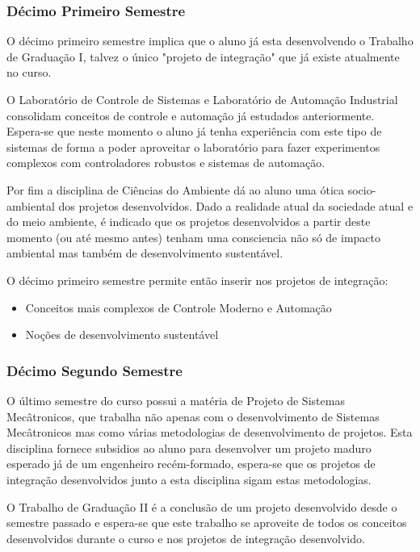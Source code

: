 \documentclass[12pt]{article} %
\begin{document}
\subsubsection{Décimo Primeiro Semestre}

O décimo primeiro semestre implica que o aluno já esta desenvolvendo o Trabalho de Graduação I, talvez o único "projeto de integração" que já existe atualmente no curso.

O Laboratório de Controle de Sistemas e Laboratório de Automação Industrial consolidam conceitos de controle e automação já estudados anteriormente. Espera-se que neste momento o aluno já tenha experiência com este tipo de sistemas de forma a poder aproveitar o laboratório para fazer experimentos complexos com controladores robustos e sistemas de automação.

Por fim a disciplina de Ciências do Ambiente dá ao aluno uma ótica socio-ambiental dos projetos desenvolvidos. Dado a realidade atual da sociedade atual e do meio ambiente, é indicado que os projetos desenvolvidos a partir deste momento (ou até mesmo antes) tenham uma consciencia não só de impacto ambiental mas também de desenvolvimento sustentável. 

O décimo primeiro semestre permite então inserir nos projetos de integração:

\begin{itemize}
\item Conceitos mais complexos de Controle Moderno e Automação
\item Noções de desenvolvimento sustentável
\end{itemize}

\subsubsection{Décimo Segundo Semestre}

O último semestre do curso possui a matéria de Projeto de Sistemas Mecâtronicos, que trabalha não apenas com o desenvolvimento de Sistemas Mecâtronicos mas como várias metodologias de desenvolvimento de projetos. Esta disciplina fornece subsidios ao aluno para desenvolver um projeto maduro esperado já de um engenheiro recém-formado, espera-se que os projetos de integração desenvolvidos junto a esta disciplina sigam estas metodologias.

O Trabalho de Graduação II é a conclusão de um projeto desenvolvido desde o semestre passado e espera-se que este trabalho se aproveite de todos os conceitos desenvolvidos durante o curso e nos projetos de integração desenvolvido.
\end{document}
